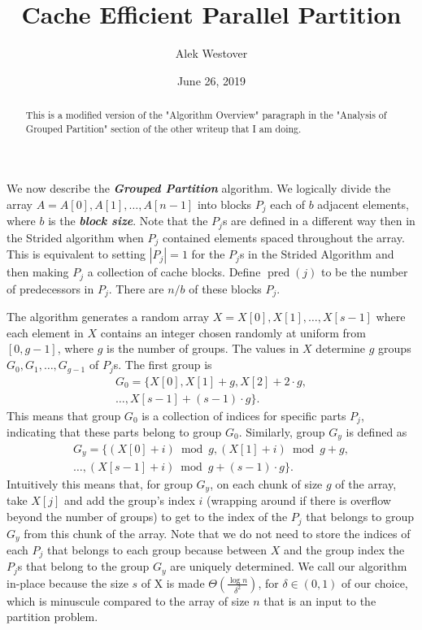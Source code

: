 \documentclass[twocolumn, twoside, 12pt]{article}
\author{\vspace{-2ex}Alek Westover\vspace{-2ex}}
\title{\vspace{-8ex}Cache Efficient Parallel Partition\vspace{-2ex}}
\date{\vspace{-2ex}June 26, 2019\vspace{-2ex}}
\def\pred{\operatorname{pred}}
\newcommand{\defn}[1]       {{\textit{\textbf{\boldmath #1}}}}
\renewcommand{\paragraph}[1]{\vspace{0.09in}\noindent{\bf \boldmath #1.}}
\begin{document}
\maketitle
\begin{abstract}
	This is a modified version of the "Algorithm Overview" paragraph in the "Analysis of Grouped Partition" section of the other writeup that I am doing. 
\end{abstract}

\paragraph{Algorithm Overview}
We now describe the \defn{Grouped Partition} algorithm.
We logically divide the array $A = A[0],A[1],\ldots, A[n-1]$ into blocks $P_j$ each of $b$ adjacent elements, where $b$ is the \defn{block size}.
Note that the $P_j$s are defined in a different way then in the Strided algorithm when $P_j$ contained elements spaced throughout the array.
This is equivalent to setting $|P_j| = 1$ for the $P_j$s in the Strided Algorithm and then making $P_j$ a collection of cache blocks.
Define \defn{$\pred(j)$} to be the number of predecessors in $P_j$.
There are $n/b$ of these blocks $P_j$.

The algorithm generates a random array $X=X[0],X[1],\ldots,X[s-1]$ where each element in $X$ contains an integer chosen randomly at uniform from $[0,g-1]$, where $g$ is the number of groups.
The values in $X$ determine $g$ groups $G_0, G_1, \ldots, G_{g-1}$ of $P_j$s.
The first group is 
\begin{multline*}
	G_0 = \{X[0], X[1]+g, X[2]+2\cdot g,\\ 
	\ldots,X[s-1]+ (s-1)\cdot g\}.
\end{multline*}
This means that group $G_0$ is a collection of indices for specific parts $P_j$, indicating that these parts belong to group $G_0$. Similarly, group $G_y$ is defined as 
\begin{multline*}
	G_y = \{(X[0]+i) \bmod g, (X[1]+i) \bmod g + g, \\
	\ldots, (X[s-1]+i) \bmod g + (s-1)\cdot g \}.
\end{multline*}
Intuitively this means that, for group $G_y$, on each chunk of size $g$ of the array, take $X[j]$ and add the group's index $i$ (wrapping around if there is overflow beyond the number of groups) to get to the index of the $P_j$ that belongs to group $G_y$ from this chunk of the array.
Note that we do not need to store the indices of each $P_j$ that belongs to each group because between $X$ and the group index the $P_j$s that belong to the group $G_y$ are uniquely determined.
We call our algorithm in-place because the size $s$ of X is made $\Theta(\frac{\log n}{\delta^2})$, for $\delta \in (0, 1)$ of our choice, which is minuscule compared to the array of size $n$ that is an input to the partition problem.
\end{document}
